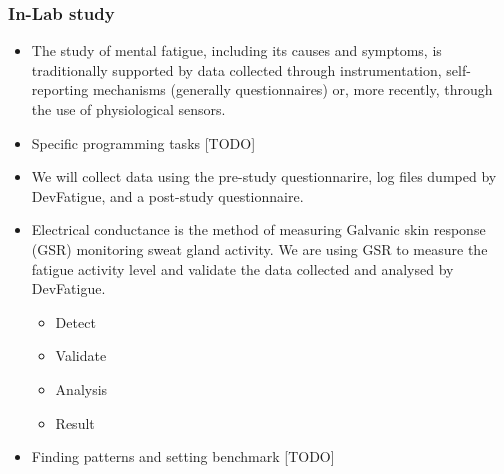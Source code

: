 \documentclass{acm_proc_article-sp}
\begin{document}
\subsubsection{In-Lab study}
\begin{itemize}
  \item The study of mental fatigue, including its causes and symptoms, is
  traditionally supported by data collected through
  instrumentation, self-reporting mechanisms (generally questionnaires) or, more
  recently, through the use of physiological sensors.
  \cite{pimenta:monitor}
  \item Specific programming tasks [TODO]
  \item We will collect data using the pre-study questionnarire, log files
  dumped by DevFatigue, and a post-study questionnaire.
  \item Electrical conductance is the method of measuring Galvanic skin response
  (GSR) monitoring sweat gland activity. We are using GSR to measure the fatigue
  activity level and validate the data collected and analysed by DevFatigue.
  \begin{itemize}
  	\item Detect
  	\item Validate
  	\item Analysis
  	\item Result
  \end{itemize}
  \item Finding patterns and setting benchmark [TODO]
\end{itemize}
\end{document}
